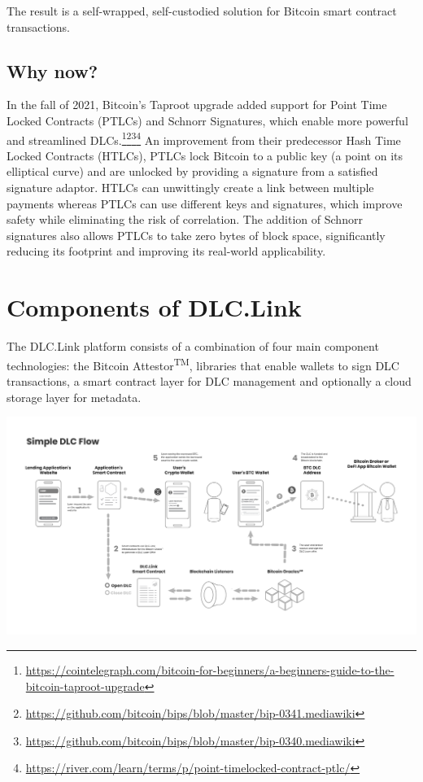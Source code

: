 \documentclass[twoside, a4paper, 11pt]{article}
\begin{document}
  The result is a self-wrapped, self-custodied solution for Bitcoin smart contract transactions.

  \subsection{Why now?}
  In the fall of 2021, Bitcoin’s Taproot upgrade added support for Point Time Locked Contracts (PTLCs) and Schnorr Signatures, which enable more powerful and streamlined DLCs.\footnote{\url{https://cointelegraph.com/bitcoin-for-beginners/a-beginners-guide-to-the-bitcoin-taproot-upgrade}}\footnote{\url{https://github.com/bitcoin/bips/blob/master/bip-0341.mediawiki}}\footnote{\url{https://github.com/bitcoin/bips/blob/master/bip-0340.mediawiki}}\footnote{\url{https://river.com/learn/terms/p/point-timelocked-contract-ptlc/}} An improvement from their predecessor Hash Time Locked Contracts (HTLCs), PTLCs lock Bitcoin to a public key (a point on its elliptical curve) and are unlocked by providing a signature from a satisfied signature adaptor. HTLCs can unwittingly create a link between multiple payments whereas PTLCs can use different keys and signatures, which improve safety while eliminating the risk of correlation. The addition of Schnorr signatures also allows PTLCs to take zero bytes of block space, significantly reducing its footprint and improving its real-world applicability.

  \section{Components of DLC.Link}

  The DLC.Link platform consists of a combination of four main component technologies: the Bitcoin Attestor\textsuperscript{TM}, libraries that enable wallets to sign DLC transactions, a smart contract layer for DLC management and optionally a cloud storage layer for metadata.
  \begin{center}
    \includegraphics[width=\textwidth]{components}
  \end{center}
\end{document}
